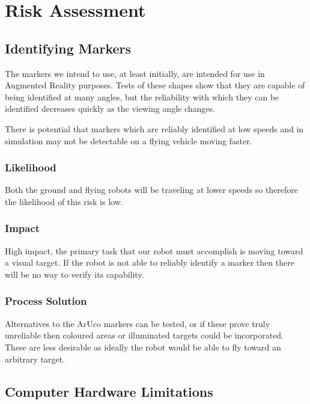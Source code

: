 \documentclass{article}
\begin{document}
\section{Risk Assessment}

	\subsection{Identifying Markers}
	
	The markers we intend to use, at least initially, are intended for use in Augmented Reality purposes. Tests of these shapes show that they are capable of being identified at many angles, but the reliability with which they can be identified decreases quickly as the viewing angle changes. 
	
	There is potential that markers which are reliably identified at low speeds and in simulation may not be detectable on a flying vehicle moving faster.
	
		\subsubsection{Likelihood}
 
		Both the ground and flying robots will be traveling at lower speeds so therefore the likelihood of this risk is low.
		
		\subsubsection{Impact}
		
		High impact, the primary task that our robot must accomplish is moving toward a visual target. If the robot is not able to reliably identify a marker then there will be no way to verify its capability.
		
		\subsubsection{Process Solution}
		
		Alternatives to the ArUco markers can be tested, or if these prove truly unreliable then coloured areas or illuminated targets could be incorporated. These are less desirable as ideally the robot would be able to fly toward an arbitrary target.
		
	\subsection{Computer Hardware Limitations}
	
\end{document}
